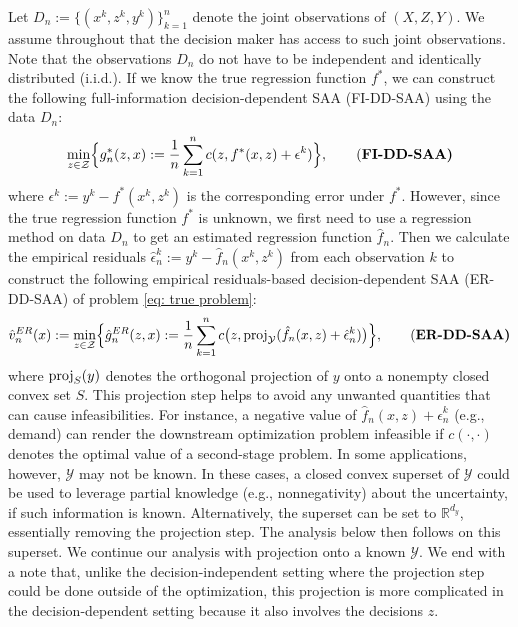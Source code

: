 \documentclass[onefignum,onetabnum]{siamart251216}
\begin{document}
Let $D_n:=\{(x^k, z^k, y^k)\}_{k=1}^n$ denote the joint observations of $(X,Z,Y)$. We assume throughout that the decision maker has access to such joint observations. Note that the observations $D_n$ do not have to be independent and identically distributed (i.i.d.). If we know the true regression function $f^*$, we can construct the following full-information decision-dependent SAA (FI-DD-SAA) using the data $D_n$:
\begin{equation}\label{eq:FI-DDSAA}
   \min_{z \in \mathcal{Z}} \Bigl\{g_n^*(z,x):= \frac{1}{n} \sum_{k=1}^n c(z,f^*(x,z) + \epsilon^k)\Bigr\},
   \tag{\bf{FI-DD-SAA}}
\end{equation}
where $\epsilon^k:= y^k - f^*(x^k,z^k)$ is the corresponding error under $f^*$. However, since the true regression function $f^*$ is unknown, we first need to use a regression method on data $D_n$ to get an estimated regression function $\hat{f}_n$. Then we calculate the empirical residuals $\hat{\epsilon}_n^k:= y^k - \hat{f}_n(x^k,z^k)$ from each observation $k$ to construct the following empirical residuals-based decision-dependent SAA (ER-DD-SAA) of problem \eqref{eq: true problem}:
\begin{equation}\label{eq: ersaa}
  \hat{v}_n^{ER}(x):= \min_{z \in \mathcal{Z}} \Bigl\{\hat{g}_n^{ER}(z,x):= \frac{1}{n} \sum_{k=1}^n c\bigl(z,{\rm{proj}}_{\mathcal{Y}}(\hat{f}_n(x,z) +\hat{\epsilon}_n^k)\bigr)\Bigr\},
  \tag{\bf{ER-DD-SAA}}
\end{equation} 
where ${\rm{proj}}_S(y)$ denotes the orthogonal projection of $y$ onto a nonempty closed convex set $S$. 
This projection step helps to avoid any unwanted quantities that can cause infeasibilities. For instance, a negative value of $\hat{f}_n(x,z)+\hat{\epsilon}_n^k$ (e.g., demand) can render the downstream optimization problem infeasible if $c(\cdot,\cdot)$ denotes the optimal value of a second-stage problem. 
In some applications, however, $\mathcal{Y}$ may not be known.
In these cases, a closed convex superset of $\mathcal{Y}$ could be used to leverage partial knowledge (e.g., nonnegativity) about the uncertainty, if such information is known. Alternatively, the superset can be set to $\mathbb{R}^{d_y}$, essentially removing the projection step. The analysis below then follows on this superset.  We continue our analysis with projection onto a known $\mathcal{Y}$. 
We end with a note that, unlike the decision-independent setting where the projection step could be done outside of the optimization, this projection is more complicated in the decision-dependent setting because it also involves the decisions $z$. 
\end{document}
